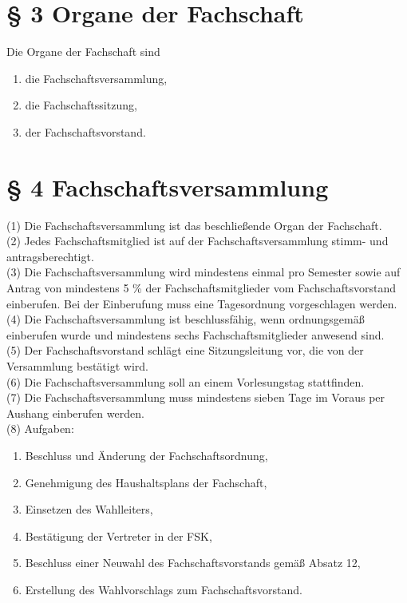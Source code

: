 \documentclass[a4paper, parskip=half, numbers=noenddot]{scrartcl}
\begin{document}
%
%

\section*{§ 3 Organe der Fachschaft}

Die Organe der Fachschaft sind
\begin{enumerate}
    \item die Fachschaftsversammlung,
    \item die Fachschaftssitzung,
    \item der Fachschaftsvorstand.
\end{enumerate}



%
%

\section*{§ 4 Fachschaftsversammlung}

(1) Die Fachschaftsversammlung ist das beschließende Organ der Fachschaft.\\

(2) Jedes Fachschaftsmitglied ist auf der Fachschaftsversammlung stimm- und antragsberechtigt.\\

(3) Die Fachschaftsversammlung wird mindestens einmal pro Semester sowie auf Antrag von mindestens 5 \% der Fachschaftsmitglieder vom Fachschaftsvorstand einberufen. Bei der Einberufung muss eine Tagesordnung vorgeschlagen werden.\\

(4) Die Fachschaftsversammlung ist beschlussfähig, wenn ordnungsgemäß einberufen wurde und mindestens sechs Fachschaftsmitglieder anwesend sind.\\

(5) Der Fachschaftsvorstand schlägt eine Sitzungsleitung vor, die von der Versammlung bestätigt wird.\\

(6) Die Fachschaftsversammlung soll an einem Vorlesungstag stattfinden.\\

(7) Die Fachschaftsversammlung muss mindestens sieben Tage im Voraus per Aushang einberufen werden.\\

(8) Aufgaben:
\begin{enumerate}
\item Beschluss und Änderung der Fachschaftsordnung,
\item Genehmigung des Haushaltsplans der Fachschaft,
\item Einsetzen des Wahlleiters,
\item Bestätigung der Vertreter in der FSK,
\item Beschluss einer Neuwahl des Fachschaftsvorstands gemäß Absatz 12,
\item Erstellung des Wahlvorschlags zum Fachschaftsvorstand.
\end{enumerate}
\end{document}
